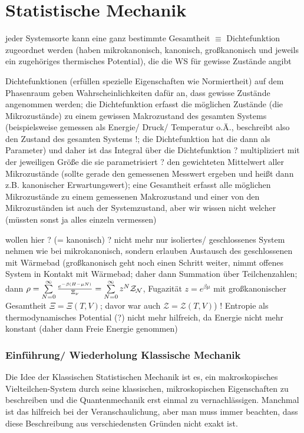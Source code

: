 \documentclass[../KlassMech_main.tex]{subfiles}
\begin{document}
\setcounter{chapter}{4}

\chapter{Statistische Mechanik}
jeder Systemsorte kann eine ganz bestimmte Gesamtheit $\equiv$ Dichtefunktion zugeordnet werden (haben mikrokanonisch, kanonisch, großkanonisch und jeweils ein zugehöriges thermisches Potential), die die WS für gewisse Zustände angibt

Dichtefunktionen (erfüllen spezielle Eigenschaften wie Normiertheit) auf dem Phasenraum geben Wahrscheinlichkeiten dafür an, dass gewisse Zustände angenommen werden; die Dichtefunktion erfasst die möglichen Zustände (die Mikrozustände) zu einem gewissen Makrozustand des gesamten Systems (beispielsweise gemessen als Energie/ Druck/ Temperatur o.Ä., beschreibt also den Zustand des gesamten Systems !; die Dichtefunktion hat die dann als Parameter) und daher ist das Integral über die Dichtefunktion ? multipliziert mit der jeweiligen Größe die sie parametrisiert ? den gewichteten Mittelwert aller Mikrozustände (sollte gerade den gemessenen Messwert ergeben und heißt dann z.B. kanonischer Erwartungswert); eine Gesamtheit erfasst alle möglichen Mikrozustände zu einem gemessenen Makrozustand und einer von den Mikrozuständen ist auch der Systemzustand, aber wir wissen nicht welcher (müssten sonst ja alles einzeln vermessen)


wollen hier ? (= kanonisch) ? nicht mehr nur isoliertes/ geschlossenes System nehmen wie bei mikrokanonisch, sondern erlauben Austausch des geschlossenen mit Wärmebad (großkanonisch geht noch einen Schritt weiter, nimmt offenes System in Kontakt mit Wärmebad; daher dann Summation über Teilchenzahlen; dann $\rho = \sum\limits_{N = 0}^\infty \frac{e^{-\beta \qty(H - \mu N)}}{\Xi_\nu} = \sum\limits_{N = 0}^\infty z^N \mathcal{Z_N}$, Fugazität $z = e^{\beta \mu}$ mit großkanonischer Gesamtheit $\Xi = \Xi(T, V)$; davor war auch $\mathcal{Z} = \mathcal{Z}(T, V)$) ! Entropie als thermodynamisches Potential (?) nicht mehr hilfreich, da Energie nicht mehr konstant (daher dann Freie Energie genommen)




	\subsection{Einführung/ Wiederholung Klassische Mechanik}
Die Idee der Klassischen Statistischen Mechanik ist es, ein makroskopisches Vielteilchen-System durch seine klassischen, mikroskopischen Eigenschaften zu beschreiben und die Quantenmechanik erst einmal zu vernachlässigen. Manchmal ist das hilfreich bei der Veranschaulichung, aber man muss immer beachten, dass diese Beschreibung aus verschiedensten Gründen nicht exakt ist.\\
\end{document}
